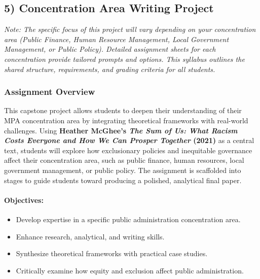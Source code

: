 \documentclass[12pt]{article}     %
\begin{document}
\subsection*{5) Concentration Area Writing Project}

\noindent \textit{Note: The specific focus of this project will vary depending on your concentration area (Public Finance, Human Resource Management, Local Government Management, or Public Policy). Detailed assignment sheets for each concentration provide tailored prompts and options. This syllabus outlines the shared structure, requirements, and grading criteria for all students.}

\subsubsection*{Assignment Overview}

This capstone project allows students to deepen their understanding of their MPA concentration area by integrating theoretical frameworks with real-world challenges. Using \textbf{Heather McGhee's \textit{The Sum of Us: What Racism Costs Everyone and How We Can Prosper Together} (2021)} as a central text, students will explore how exclusionary policies and inequitable governance affect their concentration area, such as public finance, human resources, local government management, or public policy. The assignment is scaffolded into stages to guide students toward producing a polished, analytical final paper.

\paragraph*{Objectives:}
\begin{itemize}
    \item Develop expertise in a specific public administration concentration area.
    \item Enhance research, analytical, and writing skills.
    \item Synthesize theoretical frameworks with practical case studies.
    \item Critically examine how equity and exclusion affect public administration.
\end{itemize}
\end{document}
